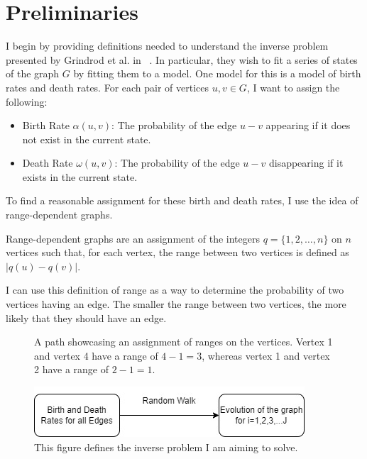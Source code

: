 
\section{Preliminaries}
I begin by providing definitions needed to understand the inverse problem presented by Grindrod et al. in ~\cite{grindrod2009}.
In particular, they wish to fit a series of states of the graph $G$ by fitting them to a model.
One model for this is a model of birth rates and death rates.
For each pair of vertices $u,v \in G$, I want to assign the following:
\begin{itemize}
	\item Birth Rate $\alpha (u, v)$: The probability of the edge $u-v$ appearing if it does not exist in the current state.
	\item Death Rate $\omega (u,v)$: The probability of the edge $u-v$ disappearing if it exists in the current state.
\end{itemize}

To find a reasonable assignment for these birth and death rates, I use the idea of range-dependent graphs.

\begin{definition} \label{def:range}
	Range-dependent graphs are an assignment of the integers $q = \{1,2,\dots,n\}$ on $n$ vertices such that, for each vertex, the range
	between two vertices is defined as $|q(u) - q(v)|$.
\end{definition}

I can use this definition of range as a way to determine the probability of two vertices having an edge. 
The smaller the range between two vertices, the more likely that they should have an edge.

\begin{figure}
	\begin{center}
		
	\end{center}
	\caption{
		A path showcasing an assignment of ranges on the vertices.
		Vertex 1 and vertex 4 have a range of $4-1 = 3$, whereas
		vertex 1 and vertex 2 have a range of $2-1=1$.
	}
	\label{fig:range}
\end{figure}

\begin{figure}
	\begin{center}
		\includegraphics{figures/Inverse Problem Figure.jpg}
	\end{center}
	\caption{
		This figure defines the inverse problem I am aiming to solve.
	}
	\label{fig:inverse}
\end{figure}

